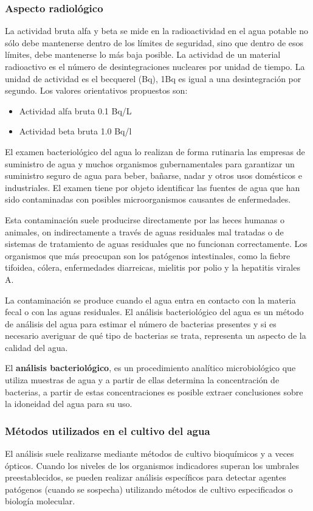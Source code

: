 \subsubsection{Aspecto radiológico}
La actividad bruta alfa y beta se mide en la radioactividad en el agua potable no sólo debe mantenerse dentro de los límites de seguridad, sino que dentro de esos límites, debe mantenerse lo más baja posible. La actividad de un material radioactivo es el número de desintegraciones nucleares por unidad de tiempo. La unidad de actividad es el becquerel (Bq), 1Bq es igual a una desintegración por segundo. Los valores orientativos propuestos son:
\begin{itemize}
    \item Actividad alfa bruta 0.1 Bq/L
    \item Actividad beta bruta 1.0 Bq/l
\end{itemize}
El examen bacteriológico del agua lo realizan de forma rutinaria las empresas de suministro de agua y muchos organismos gubernamentales para garantizar un suministro seguro de agua para beber, bañarse, nadar y otros usos domésticos e industriales. El examen tiene por objeto identificar las fuentes de agua que han sido contaminadas con posibles microorganismos causantes de enfermedades.

Esta contaminación suele producirse directamente por las heces humanas o animales, on indirectamente a través de aguas residuales mal tratadas o de sistemas de tratamiento de aguas residuales que no funcionan correctamente. Los organismos que más preocupan son los patógenos intestinales, como la fiebre tifoidea, cólera, enfermedades diarreicas, mielitis por polio y la hepatitis virales A.

La contaminación se produce cuando el agua entra en contacto con la materia fecal o con las aguas residuales.
El análisis bacteriológico del agua es un método de análisis del agua para estimar el número de bacterias presentes y si es necesario averiguar de qué tipo de bacterias se trata, representa un aspecto de la calidad del agua.

El \textbf{análisis bacteriológico}, es un procedimiento analítico microbiológico que utiliza muestras de agua y a partir de ellas determina la concentración de bacterias, a partir de estas concentraciones es posible extraer conclusiones sobre la idoneidad del agua para su uso.
\subsubsection{Métodos utilizados en el cultivo del agua}
El análisis suele realizarse mediante métodos de cultivo bioquímicos y a veces ópticos. Cuando los niveles de los organismos indicadores superan los umbrales preestablecidos, se pueden realizar análisis específicos para detectar agentes patógenos (cuando se sospecha) utilizando métodos de cultivo especificados o biología molecular.

